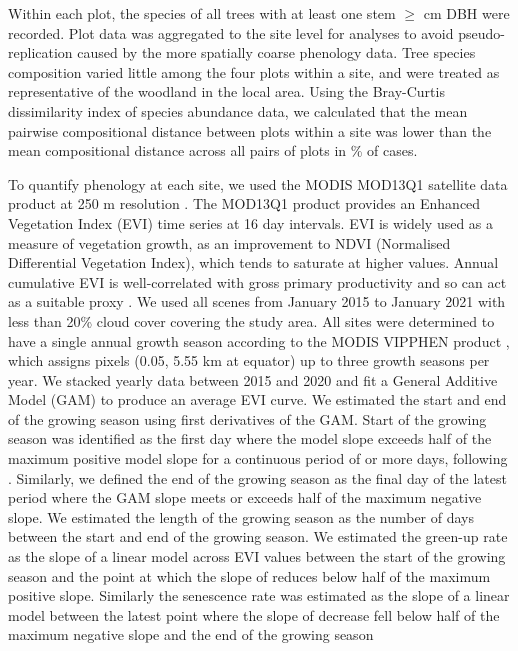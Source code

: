 \documentclass[11pt,a4paper]{article}
\begin{document}
Within each plot, the species of all trees with at least one stem
$\geq$\stemSize{} cm DBH were recorded. Plot data was aggregated to the site
level for analyses to avoid pseudo-replication caused by the more spatially
coarse phenology data. Tree species composition varied little among the four
plots within a site, and were treated as representative of the woodland in the
local area. Using the Bray-Curtis dissimilarity index of species abundance data,
we calculated that the mean pairwise compositional distance between plots within
a site was lower than the mean compositional distance across all pairs of plots
in \plotDistPer{}\% of cases.

To quantify phenology at each site, we used the MODIS MOD13Q1 satellite data
product at 250 m resolution \citep{MOD13Q1}. The MOD13Q1 product provides an
Enhanced Vegetation Index (EVI) time series at 16 day intervals. EVI is widely
used as a measure of vegetation growth, as an improvement to NDVI (Normalised
Differential Vegetation Index), which tends to saturate at higher values. Annual
cumulative EVI is well-correlated with gross primary productivity and so can act
as a suitable proxy \citep{}. We used all scenes from January 2015 to January 
2021 with less than 20\% cloud cover covering the study area.
All sites were determined to have a single annual growth season according to the MODIS VIPPHEN
product \citep{}, which assigns pixels (0.05\textdegree, 5.55 km at equator) up
to three growth seasons per year. We stacked yearly data between 2015 and 2020
and fit a General Additive Model (GAM) to produce an average EVI curve. We
estimated the start and end of the growing season using first derivatives of the
GAM. Start of the growing season was identified as the first day where the model
slope exceeds half of the maximum positive model slope for a continuous period
of \modisWin{} or more days, following \citet{White2009}. Similarly, we defined
the end of the growing season as the final day of the latest \trmmWin{} period
where the GAM slope meets or exceeds half of the maximum negative slope. We
estimated the length of the growing season as the number of days between the
start and end of the growing season. We estimated the green-up rate as the slope
of a linear model across EVI values between the start of the growing season and
the point at which the slope of reduces below half of the maximum positive
slope. Similarly the senescence rate was estimated as the slope of a linear
model between the latest point where the slope of decrease fell below half of
the maximum negative slope and the end of the growing season
\end{document}
